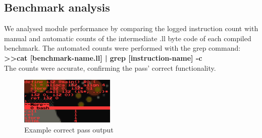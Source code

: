 \subsection{Benchmark analysis}
We analysed module performance by comparing the logged instruction count with manual and automatic counts of the intermediate .ll byte code of each compiled benchmark. The automated counts were performed with the grep command:\\
\textbf{>>cat [benchmark-name.ll] | grep [instruction-name] -c}\\
The counts were accurate, confirming the pass' correct functionality.
\begin{figure}[here]
\includegraphics[width=0.4\textwidth]{StaticInst}
\caption{Example correct pass output}
\label{StaticInstCount}
\end{figure}


